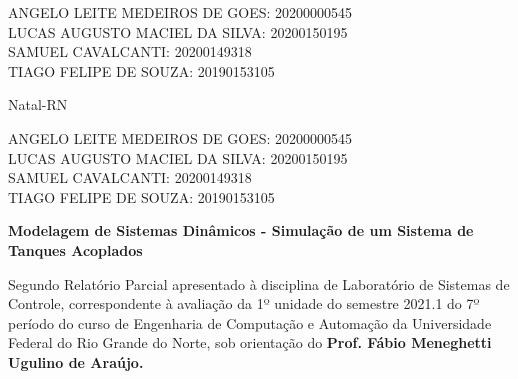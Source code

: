 \documentclass[a4paper,12pt]{article}
\newcommand{\cityandyear}{
\large Natal-RN\\
 \the\year 
 }
\begin{document}
\begin{center}
\vspace{3.0cm}



\begin{flushright}
    \begin{normalsize}
        ANGELO LEITE MEDEIROS DE GOES: 20200000545\\
        \vspace{0.6cm}
        LUCAS AUGUSTO MACIEL DA SILVA: 20200150195\\
        \vspace{0.6cm}
        SAMUEL CAVALCANTI: 20200149318\\
        \vspace{0.6cm}
        TIAGO FELIPE DE SOUZA: 20190153105\\
    \end{normalsize}
\end{flushright}


\vspace{3.1cm}

\cityandyear

\end{center}

\newpage


\thispagestyle{empty}

\begin{center}
\begin{normalsize}
ANGELO LEITE MEDEIROS DE GOES: 20200000545\\
\vspace{0.6cm}
LUCAS AUGUSTO MACIEL DA SILVA: 20200150195\\
\vspace{0.6cm}
SAMUEL CAVALCANTI: 20200149318\\
\vspace{0.6cm}
TIAGO FELIPE DE SOUZA: 20190153105\\
\end{normalsize}
\end{center}
\vspace{3.6cm}

{\bf{\large {\centering Modelagem de Sistemas Dinâmicos - Simulação de um Sistema de Tanques Acoplados\\}}}

\vspace{4cm}

\begin{adjustwidth}{7.5cm}{0cm}

{\normalsize

Segundo Relatório Parcial apresentado à disciplina de
Laboratório de Sistemas de Controle, correspondente à
avaliação da 1º unidade do semestre 2021.1 do 7º período
do curso de Engenharia de Computação e Automação da
Universidade Federal do Rio Grande do Norte, sob
orientação do {\bf Prof. Fábio Meneghetti Ugulino de
Araújo.}

}

\end{adjustwidth}
\end{document}
